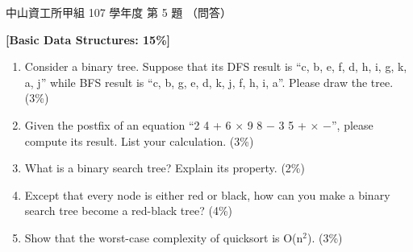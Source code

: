 \begin{pastexam}[label={px:nsysu-107-osds-01}]{中山資工所甲組 107 學年度 第 5 題}
（問答）

\textbf{[Basic Data Structures: 15\%]}
\begin{enumerate}[label=(\arabic*)]
\item Consider a binary tree. Suppose that its DFS result is ``c, b, e, f, d, h, i, g, k, a, j''
while BFS result is ``c, b, g, e, d, k, j, f, h, i, a''. Please draw the tree. (3\%)
\item Given the postfix of an equation ``2 4 + 6 $\times$ 9 8 $-$ 3 5 + $\times$ $-$'', please
compute its result. List your calculation. (3\%)
\item What is a binary search tree? Explain its property. (2\%)
\item Except that every node is either red or black, how can you make a binary search tree become
a red-black tree? (4\%)
\item Show that the worst-case complexity of quicksort is O(n$^2$). (3\%)
\end{enumerate}
\end{pastexam}

